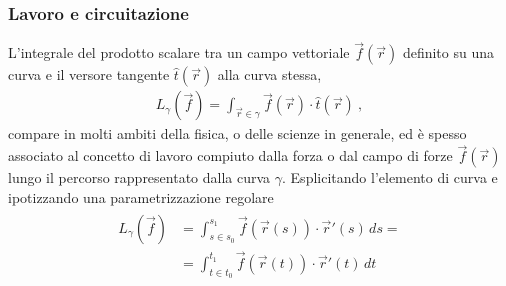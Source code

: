 \documentclass[letterpaper,10pt,italian]{jupyterBook}
\begin{document}
\subsubsection{Lavoro e circuitazione}
\label{\detokenize{ch/vector-calculus/integrals:lavoro-e-circuitazione}}\label{\detokenize{ch/vector-calculus/integrals:vector-calculus-integrals-work}}
\sphinxAtStartPar
L’integrale del prodotto scalare tra un campo vettoriale \(\vec{f}(\vec{r})\) definito su una curva e il versore tangente \(\hat{t}(\vec{r})\) alla curva stessa,
\begin{equation}\label{equation:ch/vector-calculus/integrals:eq:integral:work}
\begin{split}L_{\gamma}(\vec{f}) = \int_{\vec{r} \in \gamma} \vec{f}(\vec{r}) \cdot \hat{t}(\vec{r}) \ ,\end{split}
\end{equation}
\sphinxAtStartPar
compare in molti ambiti della fisica, o delle scienze in generale, ed è spesso associato al concetto di lavoro compiuto dalla forza o dal campo di forze \(\vec{f}(\vec{r})\) lungo il percorso rappresentato dalla curva \(\gamma\). Esplicitando l’elemento di curva e ipotizzando una parametrizzazione regolare
\begin{equation*}
\begin{split}\begin{aligned}
  L_{\gamma}(\vec{f})
  & = \int_{s \in s_0}^{s_1} \vec{f}(\vec{r}(s)) \cdot \vec{r}'(s) \, ds = \\
  & = \int_{t \in t_0}^{t_1} \vec{f}(\vec{r}(t)) \cdot \vec{r}'(t) \, dt 
\end{aligned}\end{split}
\end{equation*}
\sphinxAtStartPar
{} 
\end{document}

